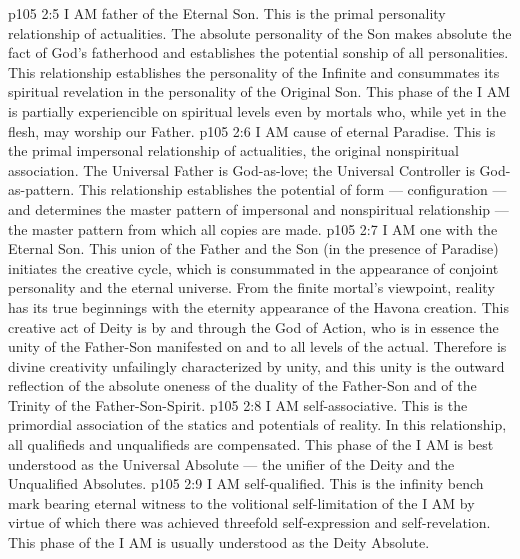 \vs p105 2:5 \bibnobreakspace {} I AM father of the Eternal Son. This is the primal personality relationship of actualities. The absolute personality of the Son makes absolute the fact of God’s fatherhood and establishes the potential sonship of all personalities. This relationship establishes the personality of the Infinite and consummates its spiritual revelation in the personality of the Original Son. This phase of the I AM is partially experiencible on spiritual levels even by mortals who, while yet in the flesh, may worship our Father.
\vs p105 2:6 \bibnobreakspace {} I AM cause of eternal Paradise. This is the primal impersonal relationship of actualities, the original nonspiritual association. The Universal Father is God\hyp{}as\hyp{}love; the Universal Controller is God\hyp{}as\hyp{}pattern. This relationship establishes the potential of form --- configuration --- and determines the master pattern of impersonal and nonspiritual relationship --- the master pattern from which all copies are made.
\vs p105 2:7 \bibnobreakspace {} I AM one with the Eternal Son. This union of the Father and the Son (in the presence of Paradise) initiates the creative cycle, which is consummated in the appearance of conjoint personality and the eternal universe. From the finite mortal’s viewpoint, reality has its true beginnings with the eternity appearance of the Havona creation. This creative act of Deity is by and through the God of Action, who is in essence the unity of the Father\hyp{}Son manifested on and to all levels of the actual. Therefore is divine creativity unfailingly characterized by unity, and this unity is the outward reflection of the absolute oneness of the duality of the Father\hyp{}Son and of the Trinity of the Father\hyp{}Son\hyp{}Spirit.
\vs p105 2:8 \bibnobreakspace {} I AM self\hyp{}associative. This is the primordial association of the statics and potentials of reality. In this relationship, all qualifieds and unqualifieds are compensated. This phase of the I AM is best understood as the Universal Absolute --- the unifier of the Deity and the Unqualified Absolutes.
\vs p105 2:9 \bibnobreakspace {} I AM self\hyp{}qualified. This is the infinity bench mark bearing eternal witness to the volitional self\hyp{}limitation of the I AM by virtue of which there was achieved threefold self\hyp{}expression and self\hyp{}revelation. This phase of the I AM is usually understood as the Deity Absolute.
